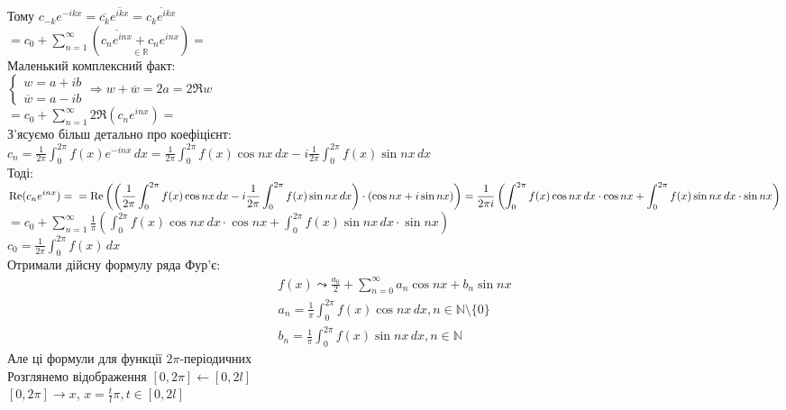 \documentclass[a4paper, 10pt]{article}
\def\hugespace{\vspace{5mm} \\}
\theoremstyle{theoremdd}
\theoremstyle{theoremdd}
\theoremstyle{theoremdd}
\theoremstyle{theoremdd}
\theoremstyle{theoremdd}
\theoremstyle{theoremdd}
\theoremstyle{theoremdd}
\theoremstyle{theoremdd}
\begin{document}
Тому $c_{-k}e^{-ikx} = \overline{c_k} \overline{e^{ikx}} = \overline{c_k e^{ikx}}$\\
$\displaystyle \boxed{=} c_0 + \sum_{n=1}^{\infty} \left( \underset{\in \mathbb{R}}{\overline{c_n e^{inx}} + c_n e^{inx}} \right) \boxed{=}$\\
Маленький комплексний факт:\\
$\begin{cases}
w = a + ib\\
\overline{w} = a - ib
\end{cases} \Rightarrow w + \overline{w} = 2a = 2\Re w
$\\
$\displaystyle \boxed{=} c_0 + \sum_{n=1}^{\infty} 2 \Re(c_n e^{inx}) \boxed{\boxed{=}}$\\
З'ясуємо більш детально про коефіцієнт:\\
$\displaystyle c_n = \frac{1}{2\pi}\int_0^{2\pi} f(x)e^{-inx}\,dx = \frac{1}{2 \pi} \int_0^{2\pi} f(x) \cos nx \,dx - i \frac{1}{2 \pi} \int_0^{2\pi} f(x) \sin nx \,dx$\\
Тоді:\\
$\displaystyle \Re (c_n e^{inx}) = \\ = \Re\left(\left(\frac{1}{2 \pi} \int_0^{2\pi} f(x) \cos nx \,dx - i \frac{1}{2 \pi} \int_0^{2\pi} f(x) \sin nx \,dx \right) \cdot \left(\cos nx + i \sin nx \right)\right) = \frac{1}{2 \pi i} \left(\int_0^{2 \pi} f(x) \cos nx \,dx \cdot \cos nx + \int_0^{2 \pi} f(x) \sin nx \,dx \cdot \sin nx \right)$\\
$\displaystyle \boxed{\boxed{=}} c_0 + \sum_{n=1}^{\infty} \frac{1}{\pi} \left(\int_0^{2 \pi} f(x) \cos nx \,dx \cdot \cos nx + \int_0^{2 \pi} f(x) \sin nx \,dx \cdot \sin nx \right)$\\
$\displaystyle c_0 = \frac{1}{2 \pi} \int_{0}^{2 \pi} f(x)\,dx$\\
Отримали дійсну формулу ряда Фур'є:
\begin{align*}
f(x) \leadsto \frac{a_0}{2} + \sum_{n=0}^{\infty} a_n \cos nx + b_n \sin nx \\
a_n = \frac{1}{\pi}\int_0^{2\pi} f(x) \cos nx \,dx, n \in \mathbb{N} \setminus \{0\} \\
b_n = \frac{1}{\pi}\int_0^{2\pi} f(x) \sin nx \,dx, n \in \mathbb{N}
\end{align*}
Але ці формули для функції $2\pi$-періодичних
\hugespace
Розглянемо відображення $[0, 2\pi] \leftarrow [0, 2l]$\\
$[0, 2\pi] \rightarrow x$, $\displaystyle x = \frac{t}{l}\pi, t \in [0,2l]$\\
\end{document}

